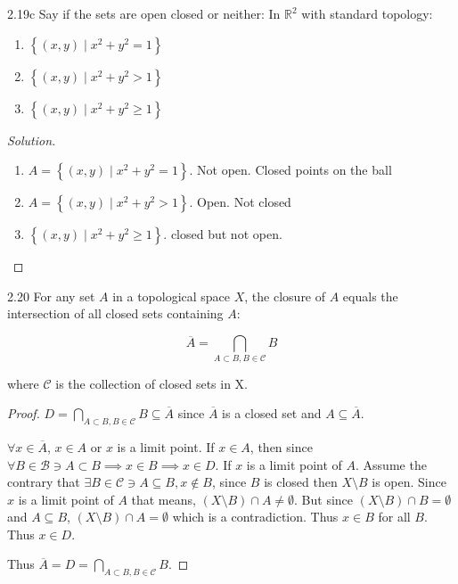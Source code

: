 \documentclass{article}
\newcommand{\R}{\mathbb{R}}
\newenvironment{solution}
{\renewcommand\qedsymbol{$\blacksquare$}\begin{proof}[Solution]}
{\end{proof}}
\begin{document}
\begin{PROB}{2.19c}\label{Problem 2.19c.}
    Say if the sets are open closed or neither: 
    In $\R^2$ with standard topology: 
    
    \begin{enumerate}
        \item $\left\{ (x, y) \mid x^2 + y^2 = 1 \right\}$ 
        \item $\left\{ (x, y) \mid x^2 + y^2 > 1 \right\}$
        \item $\left\{ (x, y) \mid x^2 + y^2 \geq 1 \right\}$
    \end{enumerate}
\end{PROB}
\begin{solution}
    \begin{enumerate}
        \item $A = \left\{ (x, y) \mid x^2 + y^2 = 1 \right\}$. Not open. Closed points on the ball
        \item $A = \left\{ (x, y) \mid x^2 + y^2 > 1 \right\}$. Open. Not closed
        \item $\left\{ (x, y) \mid x^2 + y^2 \geq 1 \right\}$. closed but not open. 
    \end{enumerate}
\end{solution}

\bigskip

\begin{claim}{2.20}\label{Claim 2.20.}
    For any set $A$ in a topological space $X$, the closure of $A$ equals the intersection of all closed sets containing $A$:
    
    \[
        \overline{A} = \bigcap_{A \subset B, B \in \mathcal{C}} B
    \]

    where $\mathcal{C}$ is the collection of closed sets in X. 
\end{claim}
\begin{proof}
    $D = \bigcap_{A \subset B, B \in \mathcal{C}} B \subseteq \overline{A}$ since $\overline{A}$ is a closed set and $A \subseteq \overline{A}$. 
    
    $\forall x \in \overline{A}$, $x \in A$ or $x$ is a limit point. If $x \in A$, then since $\forall B \in \mathcal{B} \ni A \subset B \implies x \in B \implies x \in D$. If $x$ is a limit point of $A$. Assume the contrary that $\exists B \in \mathcal{C} \ni A \subseteq B, x \not \in B$, since $B$ is closed then $X \setminus B$ is open. Since $x$ is a limit point of $A$ that means, $\left(X \setminus B\right) \cap A \neq \emptyset$. But since $\left(X \setminus B\right)\cap B = \emptyset$ and $A \subseteq B$, $\left(X \setminus B\right) \cap A = \emptyset$ which is a contradiction. Thus $x \in B$ for all $B$. Thus $x \in D$.               
    
    Thus $\overline{A} = D = \bigcap_{A \subset B, B \in \mathcal{C}} B$.  
\end{proof}
\end{document}

